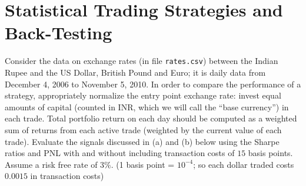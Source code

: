 \chapter{Statistical Trading Strategies and Back-Testing \label{ch:stat_ts}}

 Consider the data on exchange rates (in file \texttt{rates.csv}) between the Indian Rupee and the US Dollar, British Pound and Euro; it is daily data from December 4, 2006 to November 5, 2010. In order to compare the performance of a strategy, appropriately normalize the entry point exchange rate: invest equal amounts of capital (counted in INR, which we will call the ``base currency'') in each trade. Total portfolio return on each day should be computed as a weighted sum of returns from each active trade (weighted by the current value of each trade). Evaluate the signals discussed in (a) and (b) below using the Sharpe ratios and PNL with and without including transaction costs of $15$ basis points. Assume a risk free rate of $3\%$. (1 basis point = $10^{-4}$; so each dollar traded costs $0.0015$ in transaction costs)

